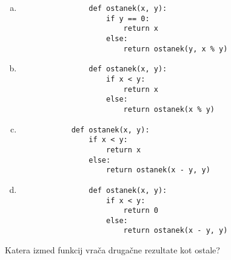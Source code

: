\documentclass[arhiv, 10pt]{../izpit}
\begin{document}
        \begin{multicols}{2}
        \begin{enumerate}[(a)]
\item 
                \begin{verbatim}
                def ostanek(x, y):
                    if y == 0:
                        return x
                    else:
                        return ostanek(y, x % y)
                \end{verbatim}
            
\item 
                \begin{verbatim}
                def ostanek(x, y):
                    if x < y:
                        return x
                    else:
                        return ostanek(x % y)
                \end{verbatim}
            
\item 
            \begin{verbatim}
            def ostanek(x, y):
                if x < y:
                    return x
                else:
                    return ostanek(x - y, y)
            \end{verbatim}
        
\item 
                \begin{verbatim}
                def ostanek(x, y):
                    if x < y:
                        return 0
                    else:
                        return ostanek(x - y, y)
                \end{verbatim}
            
\end{enumerate}

        \end{multicols}
    
        \naloga*
        
        Katera izmed funkcij vrača drugačne rezultate kot ostale?
    
\end{document}
